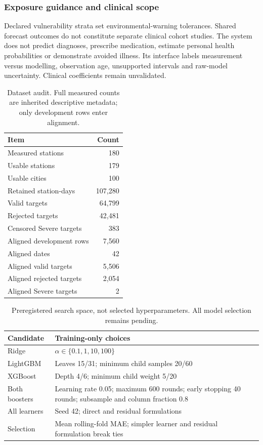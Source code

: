 \subsubsection{Exposure guidance and clinical scope}
Declared vulnerability strata set environmental-warning tolerances. Shared
forecast outcomes do not constitute separate clinical cohort studies. The
system does not predict diagnoses, prescribe medication, estimate personal
health probabilities or demonstrate avoided illness. Its interface labels
measurement versus modelling, observation age, unsupported intervals and
raw-model uncertainty. Clinical coefficients remain unvalidated.

\begin{table}[t]\centering\caption{Dataset audit. Full measured counts are inherited descriptive metadata; only development rows enter alignment.}
\begin{tabular}{lr}\toprule Item & Count\\\midrule
Measured stations & 180\\
Usable stations & 179\\
Usable cities & 100\\
Retained station-days & 107,280\\
Valid targets & 64,799\\
Rejected targets & 42,481\\
Censored Severe targets & 383\\
\midrule
Aligned development rows & 7,560\\
Aligned dates & 42\\
Aligned valid targets & 5,506\\
Aligned rejected targets & 2,054\\
Aligned Severe targets & 2\\
\bottomrule\end{tabular}\end{table}
\begin{table}[t]\centering\caption{Preregistered search space, not selected hyperparameters. All model selection remains pending.}
\begin{tabular}{lp{}}\toprule Candidate & Training-only choices\\\midrule
Ridge & $\alpha\in\{0.1,1,10,100\}$\\
LightGBM & Leaves 15/31; minimum child samples 20/60\\
XGBoost & Depth 4/6; minimum child weight 5/20\\
Both boosters & Learning rate 0.05; maximum 600 rounds; early stopping 40 rounds; subsample and column fraction 0.8\\
All learners & Seed 42; direct and residual formulations\\
Selection & Mean rolling-fold MAE; simpler learner and residual formulation break ties\\
\bottomrule\end{tabular}\end{table}

